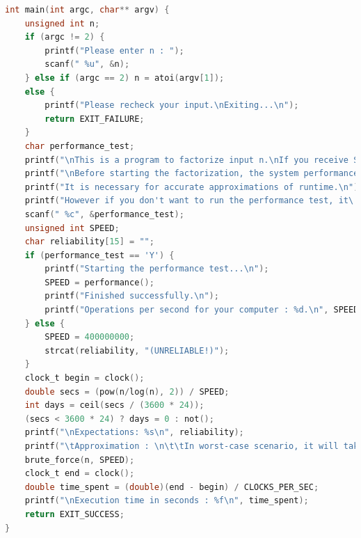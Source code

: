 \documentclass[a4paper, 12pt]{article}
\begin{document}
\begin{lstlisting}[language=C, caption=Source Code of factor-with-primes.c]
int main(int argc, char** argv) {
    unsigned int n;
    if (argc != 2) {
        printf("Please enter n : ");
        scanf(" %u", &n);
    } else if (argc == 2) n = atoi(argv[1]);
    else {
        printf("Please recheck your input.\nExiting...\n");
        return EXIT_FAILURE;
    }
    char performance_test;
    printf("\nThis is a program to factorize input n.\nIf you receive Segmentation error when executing, it means that you don\'t have enough RAM capacity to hold prime numbers\n");
    printf("\nBefore starting the factorization, the system performance test shoukd be performed.\n");
    printf("It is necessary for accurate approximations of runtime.\n");
    printf("However if you don't want to run the performance test, it\'s up to you. Run it? (Y/n) ");
    scanf(" %c", &performance_test);
    unsigned int SPEED;
    char reliability[15] = "";
    if (performance_test == 'Y') {
        printf("Starting the performance test...\n");
        SPEED = performance();
        printf("Finished successfully.\n");
        printf("Operations per second for your computer : %d.\n", SPEED);
    } else {
        SPEED = 400000000;
        strcat(reliability, "(UNRELIABLE!)");
    }
    clock_t begin = clock();
    double secs = (pow(n/log(n), 2)) / SPEED;
    int days = ceil(secs / (3600 * 24));
    (secs < 3600 * 24) ? days = 0 : not();
    printf("\nExpectations: %s\n", reliability);
    printf("\tApproximation : \n\t\tIn worst-case scenario, it will take %f seconds or %d day(s)\n", secs, days);
    brute_force(n, SPEED);
    clock_t end = clock();
    double time_spent = (double)(end - begin) / CLOCKS_PER_SEC;
    printf("\nExecution time in seconds : %f\n", time_spent);
    return EXIT_SUCCESS;
}
  \end{lstlisting}

\newpage


\end{document}
